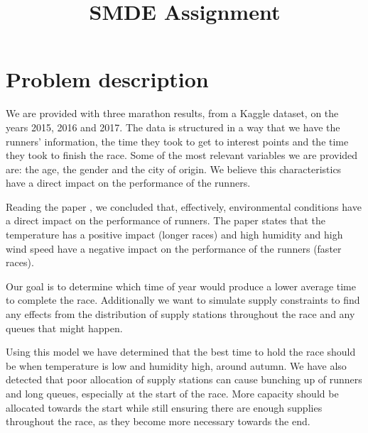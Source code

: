 \documentclass[conference]{IEEEtran}
\begin{document}
\title{SMDE Assignment}

\author{
\and
{}
\and
{}
}

\maketitle

\section{Problem description}
We are provided with three marathon results, from a Kaggle dataset, on the years 2015, 2016 and 2017. The data is structured in a way that we have the runners' information, the time they took to get to interest points and the time they took to finish the race. Some of the most relevant variables we are provided are: the age, the gender and the city of origin. We believe this characteristics have a direct impact on the performance of the runners.

Reading the paper \cite{b8}, we concluded that, effectively, environmental conditions have a direct impact on the performance of runners. The paper states that the temperature has a positive impact (longer races) and high humidity and high wind speed have a negative impact on the performance of the runners (faster races).

Our goal is to determine which time of year would produce a lower average time to complete the race. Additionally we want to simulate supply constraints to find any effects from the distribution of supply stations throughout the race and any queues that might happen.

Using this model we have determined that the best time to hold the race should be when temperature is low and humidity high, around autumn. We have also detected that poor allocation of supply stations can cause bunching up of runners and long queues, especially at the start of the race. More capacity should be allocated towards the start while still ensuring there are enough supplies throughout the race, as they become more necessary towards the end.
\end{document}
